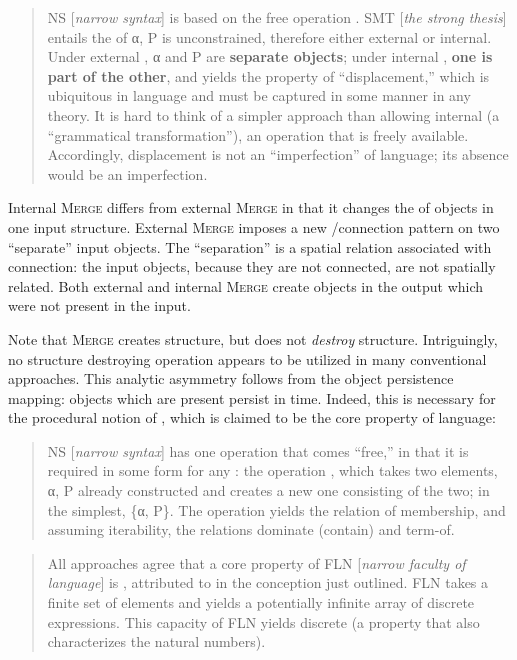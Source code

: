 \begin{quote}
NS [\textit{narrow syntax}] is based on the free operation . SMT [\textit{the strong  thesis}] entails the  of α, P is unconstrained, therefore either external or internal. Under external , α and P are \textbf{separate objects}; under internal , \textbf{one is part of the other}, and  yields the property of “displacement,” which is ubiquitous in language and must be captured in some manner in any theory. It is hard to think of a simpler approach than allowing internal  (a “grammatical transformation”), an operation that is freely available. Accordingly, displacement is not an “imperfection” of language; its absence would be an imperfection. \citep[8]{Chomsky2001b}
\end{quote}

  Internal \textsc{Merge} differs from external \textsc{Merge} in that it changes the  of objects in one input structure. External \textsc{Merge} imposes a new /connection pattern on two “separate” input objects. The “separation” is a spatial relation associated with connection: the input objects, because they are not connected, are not spatially related. Both external and internal \textsc{Merge} create objects in the output which were not present in the input. 

  Note that \textsc{Merge} creates structure, but does not \textit{destroy} structure. Intriguingly, no structure destroying operation appears to be utilized in many conventional approaches. This analytic asymmetry follows from the object persistence mapping: objects which are present persist in time. Indeed, this is necessary for the procedural notion of , which is claimed to be the core property of language:

\begin{quote}
NS [\textit{narrow syntax}] has one operation that comes “free,” in that it is required in some form for any : the operation , which takes two elements, α, P already constructed and creates a new one consisting of the two; in the simplest, \{α, P\}. The operation yields the relation of membership, and assuming iterability, the relations dominate (contain) and term-of. \citep[6]{Chomsky2001b}
\end{quote}

\begin{quote}
All approaches agree that a core property of FLN [\textit{narrow faculty of language}] is , attributed to  in the conception just outlined. FLN takes a finite set of elements and yields a potentially infinite array of discrete expressions. This capacity of FLN yields discrete  (a property that also characterizes the natural numbers). \citep[1571]{HauserEtAl2002}
\end{quote}

